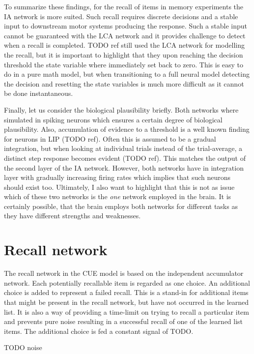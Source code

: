 To summarize these findings, for the recall of items in memory experiments the IA network is more suited.
Such recall requires discrete decisions and a stable input to downstream motor systems producing the response.
Such a stable input cannot be guaranteed with the LCA network and it provides challenge to detect when a recall is completed.
TODO ref still used the LCA network for modelling the recall, but it is important to highlight that they upon reaching the decision threshold the state variable where immediately set back to zero.
This is easy to do in a pure math model, but when transitioning to a full neural model detecting the decision and resetting the state variables is much more difficult as it cannot be done instantaneous.

Finally, let us consider the biological plausibility briefly.
Both networks where simulated in spiking neurons which ensures a certain degree of biological plausibility.
Also, accumulation of evidence to a threshold is a well known finding for neurons in LIP (TODO ref).
Often this is assumed to be a gradual integration, but when looking at individual trials instead of the trial-average, a distinct step response becomes evident (TODO ref).
This matches the output of the second layer of the IA network.
However, both networks have in integration layer with gradually increasing firing rates which implies that such neurons should exist too.
Ultimately, I also want to highlight that this is not as issue which of these two networks is the \emph{one} network employed in the brain.
It is certainly possible, that the brain employs both networks for different tasks as they have different strengths and weaknesses.


\section{Recall network}\label{sec:recall-net}
The recall network in the CUE model is based on the independent accumulator network.
Each potentially recallable item is regarded as one choice.
An additional choice is added to represent a failed recall.
This is a stand-in for additional items that might be present in the recall network, but have not occurred in the learned list.
It is also a way of providing a time-limit on trying to recall a particular item and prevents pure noise resulting in a successful recall of one of the learned list items.
The additional choice is fed a constant signal of TODO\@.

TODO noise

